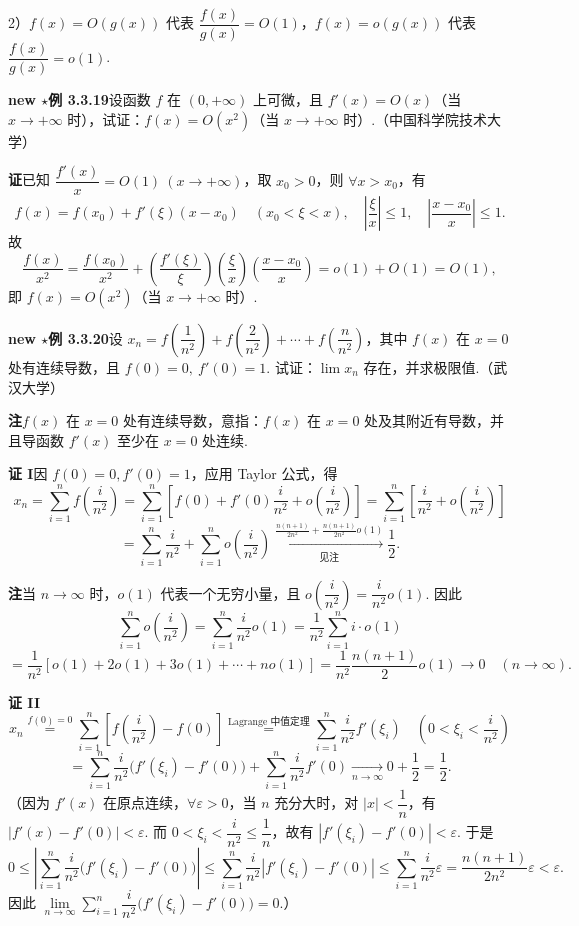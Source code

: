 \documentclass[UTF8,12pt,a4paper,fontset=fandol]{ctexart}
\begin{document}
2）$f(x)=O(g(x))$ 代表 $\dfrac{f(x)}{g(x)}=O(1)$，$f(x)=o(g(x))$ 代表 $\dfrac{f(x)}{g(x)}=o(1)$.

\noindent\textbf{new $\star$例 3.3.19}\quad 设函数 $f$ 在 $(0,+\infty)$ 上可微，且 $f'(x)=O(x)$（当 $x\to+\infty$ 时），试证：$f(x)=O(x^2)$（当 $x\to+\infty$ 时）.（中国科学院技术大学）

\noindent\textbf{证}\quad 已知 $\dfrac{f'(x)}x=O(1)\ (x\to+\infty)$，取 $x_0>0$，则 $\forall x>x_0$，有
\[
  f(x)=f(x_0)+f'(\xi)(x-x_0)\quad(x_0<\xi<x),\quad \left|\frac{\xi}{x}\right|\le1,\quad \left|\frac{x-x_0}{x}\right|\le1.
\]
故
\[
  \frac{f(x)}{x^2}=\frac{f(x_0)}{x^2}
  +\left(\frac{f'(\xi)}{\xi}\right)\left(\frac{\xi}{x}\right)\left(\frac{x-x_0}{x}\right)
  =o(1)+O(1)=O(1),
\]
即 $f(x)=O(x^2)$（当 $x\to+\infty$ 时）.

\noindent\textbf{new $\star$例 3.3.20}\quad 设 $x_n=f\left(\dfrac1{n^2}\right)+f\left(\dfrac2{n^2}\right)+\cdots+f\left(\dfrac n{n^2}\right)$，其中 $f(x)$ 在 $x=0$ 处有连续导数，且 $f(0)=0,\ f'(0)=1$. 试证：$\lim x_n$ 存在，并求极限值.（武汉大学）

\noindent\textbf{注}\quad $f(x)$ 在 $x=0$ 处有连续导数，意指：$f(x)$ 在 $x=0$ 处及其附近有导数，并且导函数 $f'(x)$ 至少在 $x=0$ 处连续.

\noindent\textbf{证 I}\quad 因 $f(0)=0,f'(0)=1$，应用 Taylor 公式，得
\[
  x_n=\sum_{i=1}^n f\left(\frac{i}{n^2}\right)
  =\sum_{i=1}^n\left[f(0)+f'(0)\frac{i}{n^2}+o\left(\frac{i}{n^2}\right)\right]
  =\sum_{i=1}^n\left[\frac{i}{n^2}+o\left(\frac{i}{n^2}\right)\right]
\]
\[
  =\sum_{i=1}^n\frac{i}{n^2}+\sum_{i=1}^n o\left(\frac{i}{n^2}\right)
  \xrightarrow[\text{见注}]{\frac{n(n+1)}{2n^2}+\frac{n(n+1)}{2n^2}o(1)}
  \frac12.
\]

\noindent\textbf{注}\quad 当 $n\to\infty$ 时，$o(1)$ 代表一个无穷小量，且 $o\left(\dfrac{i}{n^2}\right)=\dfrac{i}{n^2}o(1)$. 因此
\[
  \sum_{i=1}^n o\left(\frac{i}{n^2}\right)
  =\sum_{i=1}^n\frac{i}{n^2}o(1)
  =\frac1{n^2}\sum_{i=1}^n i\cdot o(1)
\]
\[
  =\frac1{n^2}[o(1)+2o(1)+3o(1)+\cdots+no(1)]
  =\frac1{n^2}\frac{n(n+1)}2o(1)\to0\quad(n\to\infty).
\]

\noindent\textbf{证 II}\quad
\[
  x_n\overset{f(0)=0}{=}\sum_{i=1}^n\left[f\left(\frac{i}{n^2}\right)-f(0)\right]
  \overset{\text{Lagrange 中值定理}}{=}
  \sum_{i=1}^n\frac{i}{n^2}f'(\xi_i)\quad\left(0<\xi_i<\frac{i}{n^2}\right)
\]
\[
  =\sum_{i=1}^n\frac{i}{n^2}\bigl(f'(\xi_i)-f'(0)\bigr)+\sum_{i=1}^n\frac{i}{n^2}f'(0)
  \xrightarrow[n\to\infty]{}0+\frac12=\frac12.
\]
（因为 $f'(x)$ 在原点连续，$\forall\varepsilon>0$，当 $n$ 充分大时，对 $|x|<\dfrac1n$，有 $|f'(x)-f'(0)|<\varepsilon$. 而 $0<\xi_i<\dfrac{i}{n^2}\le\dfrac1n$，故有 $|f'(\xi_i)-f'(0)|<\varepsilon$. 于是
\[
  0\le \left|\sum_{i=1}^n\frac{i}{n^2}\bigl(f'(\xi_i)-f'(0)\bigr)\right|
  \le\sum_{i=1}^n\frac{i}{n^2}|f'(\xi_i)-f'(0)|
  \le\sum_{i=1}^n\frac{i}{n^2}\varepsilon=\frac{n(n+1)}{2n^2}\varepsilon<\varepsilon.
\]
因此 $\lim\limits_{n\to\infty}\sum\limits_{i=1}^n\dfrac{i}{n^2}\bigl(f'(\xi_i)-f'(0)\bigr)=0$.）
\end{document}
